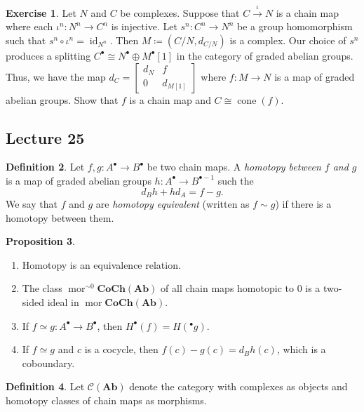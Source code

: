\documentclass[10pt,letterpaper,cm]{nupset}
\theoremstyle{definition}
\newtheorem{definition}{Definition}[subsection]
\theoremstyle{theorem}
\newtheorem{prop}[definition]{Proposition}
\newtheorem{exercise}[definition]{Exercise}
\theoremstyle{remark}
\newcommand{\1}{\mathbf{1}}
\newcommand{\0}{\vec 0}
\DeclareMathOperator{\id}{id}
\DeclareMathOperator{\mor}{mor}
\DeclareMathOperator{\cone}{cone}
\begin{document}
\begin{exercise} 
\item  Let $N$ and $C$ be complexes. Suppose that $C \overset{\iota}{\longrightarrow} N$ is a chain map where each $\iota^n :N^n \to C^n$ is injective. Let $s^n : C^n \to N^n$ be a group homomorphism such that $s^n \circ \iota^n = \id_{N^n}$. Then $M\coloneqq  (C/N, d_{C/N})$ is a complex. Our choice of $s^n$ produces a splitting $C^{\bullet} \cong N^{\bullet} \oplus M^{\bullet}[1]$ in the category of  graded abelian groups. Thus, we have the map $d_C = \begin{bmatrix} d_N & f \\ 0 & d_{M[1]} \end{bmatrix}$ where $f: M \to N$ is a map of graded abelian groups. Show that $f$ is a chain map and $C \cong \cone(f)$.
\end{exercise}

\subsection{Lecture 25}

\begin{definition}
Let $f, g : A^{\bullet} \to B^{\bullet}$ be two chain maps. A \textit{homotopy between $f$ and $g$} is a map of graded abelian groups $h: A^{\bullet} \to B^{\bullet -1}$ such the $$d_Bh + hd_A = f-g. $$ We say that $f$ and $g$ are \textit{homotopy equivalent} (written as $f \sim g$) if there is a homotopy between them.
\end{definition}

\begin{prop} $ $
\begin{enumerate}
\item Homotopy is an equivalence relation. 
\item The class $\mor^{\sim{0}}{\mathbf{CoCh(Ab)}}$ of all chain maps homotopic to $0$ is a two-sided ideal in  $\mor{\mathbf{CoCh(Ab)}}$. 
\item If $ f \simeq g: A^{\bullet} \to B^{\bullet}$, then $H^{\bullet}(f) = H(^{\bullet}g)$.
\item If $f\simeq g$ and $c$ is a cocycle, then $f(c) - g(c) = d_Bh(c)$, which is a coboundary.
\end{enumerate}
\end{prop}

\begin{definition}
Let $\mathcal{C}(\mathbf{Ab})$ denote the category with complexes as objects and homotopy classes of chain maps as morphisms.  
\end{definition}
\end{document}
